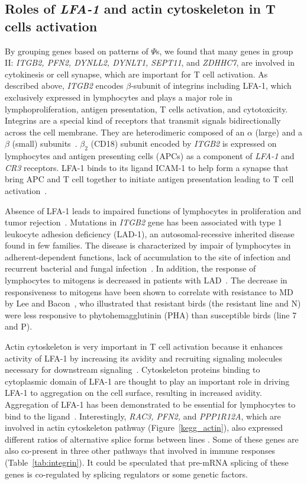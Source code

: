 \documentclass[10pt]{article}
\begin{document}
\subsection*{Roles of {\em LFA-1} and actin cytoskeleton in T
cells activation}

By grouping genes based on patterns of $\Psi$s, we found that
many genes in group II: {\em ITGB2, PFN2, DYNLL2, DYNLT1,
SEPT11}, and {\em ZDHHC7}, are involved in cytokinesis or cell
synapse, which are important for T cell activation.  As described
above, {\em ITGB2} encodes $\beta$-subunit of integrins including
LFA-1, which exclusively expressed in lymphocytes and plays a
major role in lymphoproliferation, antigen presentation, T cells
activation, and cytotoxicity.  Integrins are a special kind of
receptors that transmit signals bidirectionally across the cell
membrane.  They are heterodimeric composed of an $\alpha$ (large)
and a $\beta$ (small) subunits~\cite{wang2010immunopathologies}.
$\beta_{2}$ (CD18) subunit encoded by {\em ITGB2} is expressed on
lymphocytes and antigen presenting cells (APCs) as a component of
{\em LFA-1} and {\em CR3} receptors.  LFA-1 binds to its ligand
ICAM-1 to help form a synapse that bring APC and T cell together
to initiate antigen presentation leading to T cell
activation~\cite{dustin2000immunological}.

Absence of LFA-1 leads to impaired functions of lymphocytes in
proliferation and tumor
rejection~\cite{scharffetter1998spontaneous,schmits1996lfa}.
Mutations in {\em ITGB2} gene has been associated with type 1
leukocyte adhesion deficiency (LAD-1), an autosomal-recessive
inherited disease found in few families.  The disease is
characterized by impair of lymphocytes in adherent-dependent
functions, lack of accumulation to the site of infection and
recurrent bacterial and fungal
infection~\cite{springer1987lymphocyte}.  In addition, the
response of lymphocytes to mitogens is decreased in patients with
LAD~\cite{springer1987lymphocyte}.  The decrease in
responsiveness to mitogens have been shown to correlate with
resistance to MD by Lee and Bacon~\cite{lee1983ontogeny}, who
illustrated that resistant birds (the resistant line and N) were
less responsive to phytohemagglutinin (PHA) than susceptible
birds (line 7 and P).

Actin cytoskeleton is very important in T cell activation because
it enhances activity of LFA-1 by increasing its avidity and
recruiting signaling molecules necessary for downstream
signaling~\cite{dustin2000immunological, van2000avidity}.
Cytoskeleton proteins binding to cytoplasmic domain of LFA-1 are
thought to play an important role in driving LFA-1 to aggregation
on the cell surface, resulting in increased avidity.  Aggregation
of LFA-1 has been demonstrated to be essential for lymphocytes to
bind to the ligand~\cite{van1994extracellular}.  Interestingly,
{\em RAC3, PFN2,} and {\em PPP1R12A}, which are involved in actin
cytoskeleton pathway (Figure~\ref{kegg_actin}), also expressed
different ratios of alternative splice forms between lines .
Some of these genes are also co-present in three other pathways
that involved in immune responses (Table~\ref{tab:integrin}).  It
could be speculated that pre-mRNA splicing of these genes is
co-regulated by splicing regulators or some genetic factors.
\end{document}
